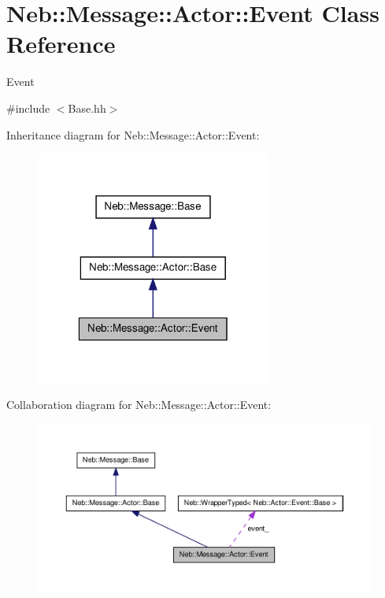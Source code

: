 \hypertarget{classNeb_1_1Message_1_1Actor_1_1Event}{\section{\-Neb\-:\-:\-Message\-:\-:\-Actor\-:\-:\-Event \-Class \-Reference}
\label{classNeb_1_1Message_1_1Actor_1_1Event}
}


\-Event  




{\ttfamily \#include $<$\-Base.\-hh$>$}



\-Inheritance diagram for \-Neb\-:\-:\-Message\-:\-:\-Actor\-:\-:\-Event\-:\nopagebreak
\begin{figure}[H]
\begin{center}
\leavevmode
\includegraphics[width=220pt]{classNeb_1_1Message_1_1Actor_1_1Event__inherit__graph}
\end{center}
\end{figure}


\-Collaboration diagram for \-Neb\-:\-:\-Message\-:\-:\-Actor\-:\-:\-Event\-:\nopagebreak
\begin{figure}[H]
\begin{center}
\leavevmode
\includegraphics[width=350pt]{classNeb_1_1Message_1_1Actor_1_1Event__coll__graph}
\end{center}
\end{figure}
